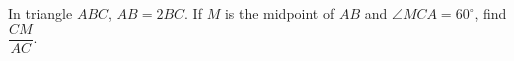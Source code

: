 In triangle $ABC$, $AB=2BC$. If $M$ is the midpoint of $AB$ and $\angle MCA=60^\circ$, find $\dfrac{CM}{AC}$.
